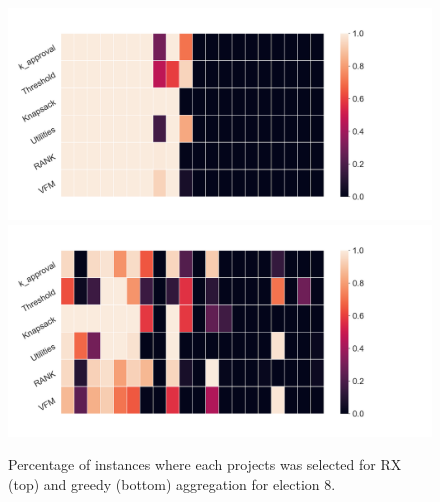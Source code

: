 \documentclass[10pt]{article}
\begin{document}
\begin{appendices}
\begin{figure}[!htbp]
\begin{center}
\includegraphics[width=18cm]{experiment/election_8_rx.png}
\includegraphics[width=18cm]{experiment/election_8_greedy.png}
\caption{Percentage of instances where each projects was selected for RX (top) and greedy (bottom)
aggregation for election 8.
}\label{fig:stability8}
\end{center}
\end{figure}



\end{appendices}
\end{document}
